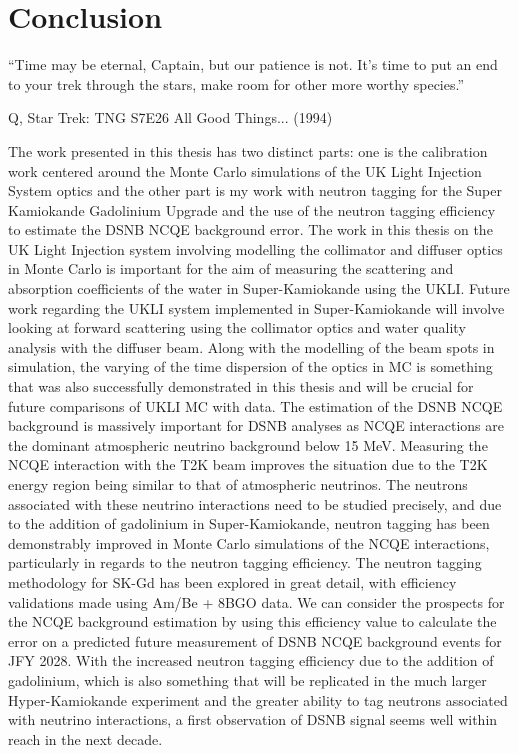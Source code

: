 \chapter{Conclusion}
\epigraph{``Time may be eternal, Captain, but our patience is not. It's time to put an end to your trek through the stars, make room for other more worthy species.''}{Q, Star Trek: TNG S7E26 All Good Things... (1994)}
\label{chp:conc}

The work presented in this thesis has two distinct parts: one is the calibration work centered around the Monte Carlo simulations of the UK Light Injection System optics and the other part is my work with neutron tagging for the Super Kamiokande Gadolinium Upgrade and the use of the neutron tagging efficiency to estimate the DSNB NCQE background error. 
\newline
The work in this thesis on the UK Light Injection system involving modelling the collimator and diffuser optics in Monte Carlo is important for the aim of measuring the scattering and absorption coefficients of the water in Super-Kamiokande using the UKLI. Future work regarding the UKLI system implemented in Super-Kamiokande will involve looking at forward scattering using the collimator optics and water quality analysis with the diffuser beam. Along with the modelling of the beam spots in simulation, the varying of the time dispersion of the optics in MC is something that was also successfully demonstrated in this thesis and will be crucial for future comparisons of UKLI MC with data.
\newline
The estimation of the DSNB NCQE background is massively important for DSNB analyses as NCQE interactions are the dominant atmospheric neutrino background below 15 MeV. Measuring the NCQE interaction with the T2K beam improves the situation due to the T2K energy region being similar to that of atmospheric neutrinos. The neutrons associated with these neutrino interactions need to be studied precisely, and due to the addition of gadolinium in Super-Kamiokande, neutron tagging has been demonstrably improved in Monte Carlo simulations of the NCQE interactions, particularly in regards to the neutron tagging efficiency. The neutron tagging methodology for SK-Gd has been explored in great detail, with efficiency validations made using Am/Be + 8BGO data. We can consider the prospects for the NCQE background estimation by using this efficiency value to calculate the error on a predicted future measurement of DSNB NCQE background events for JFY 2028. With the increased neutron tagging efficiency due to the addition of gadolinium, which is also something that will be replicated in the much larger Hyper-Kamiokande experiment and the greater ability to tag neutrons associated with neutrino interactions, a first observation of DSNB signal seems well within reach in the next decade.



